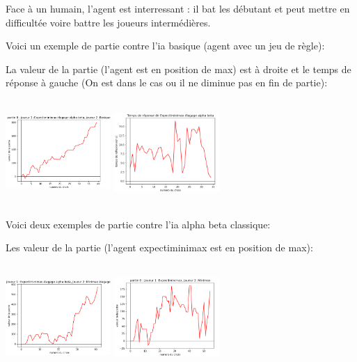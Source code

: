                 Face à un humain, l'agent est interressant : il bat les débutant et peut mettre en difficultée voire battre les joueurs intermédières.
                
                Voici un exemple de partie contre l'ia basique (agent avec un jeu de règle):
			    
			    La valeur de la partie (l'agent est en position de max) est à droite et le temps de réponse à gauche (On est dans le cas ou il ne diminue pas en fin de partie):
			    
			    \includegraphics[width=4cm,height=4cm]{graphiques/valeur_alphbet2_basique1}                \includegraphics[width=4cm,height=4cm]{graphiques/temps_alphbet2_basique1}
                
                Voici deux exemples de partie contre l'ia alpha beta classique:
			    
			    Les valeur de la partie (l'agent expectiminimax est en position de max):
			    
			    \includegraphics[width=4cm,height=4cm]{graphiques/valeur_alphbet2_alphabet1}
			    \includegraphics[width=4cm,height=4cm]{graphiques/valeur_alphbet2_alphabet2}
			    
